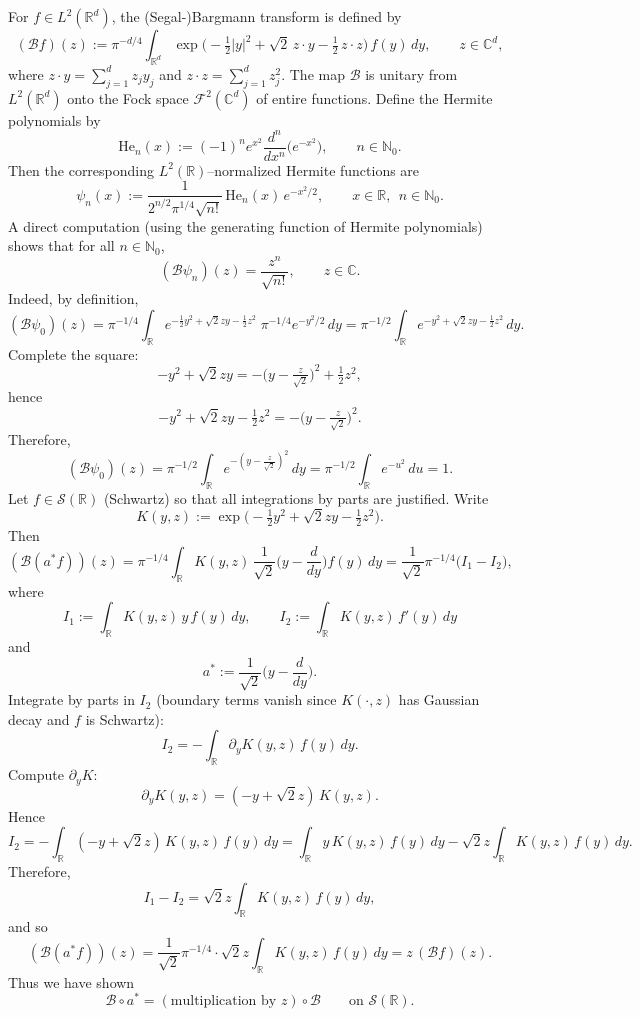 \documentclass[11pt]{article}
\theoremstyle{remark}
\numberwithin{equation}{section}
\newcommand{\C}{\mathbb{C}}
\newcommand{\R}{\mathbb{R}}
\newcommand{\N}{\mathbb{N}}
\begin{document}
For $f\in L^2(\R^d)$, the (Segal-)Bargmann transform is defined by
\[
(\mathcal B f)(z)
:=\pi^{-d/4}\int_{\R^d}
\exp\!\Big(-\tfrac12|y|^2+\sqrt2\,z\cdot y-\tfrac12\,z\cdot z\Big)\,f(y)\,dy,
\qquad z\in\C^d,
\]
where $z\cdot y=\sum_{j=1}^d z_j y_j$ and $z\cdot z=\sum_{j=1}^d z_j^2$.
The map $\mathcal B$ is unitary from $L^2(\R^d)$ onto the Fock space
$\mathcal F^2(\C^d)$ of entire functions. Define the  Hermite polynomials by
\[
\mathrm{He}_n(x):=(-1)^n e^{x^2}\frac{d^n}{dx^n}\Big(e^{-x^2}\Big),
\qquad n\in\N_0.
\]
Then the corresponding $L^2(\R)$--normalized Hermite functions are
\begin{equation}\label{eq:psi-n-prob}
\psi_n(x)
:=\frac{1}{2^{n/2}\pi^{1/4}\sqrt{n!}}\,
\mathrm{He}_n(x)\,e^{-x^2/2},
\qquad x\in\R,\ \ n\in\N_0.
\end{equation}
A direct computation (using the generating function of Hermite polynomials)
shows that for all $n\in\N_0$,
\[
(\mathcal B\psi_n)(z)=\frac{z^n}{\sqrt{n!}},
\qquad z\in\C.
\]
Indeed, by definition,
\[
(\mathcal B\psi_0)(z)
=\pi^{-1/4}\int_{\R}
e^{-\frac12 y^2+\sqrt2zy-\frac12 z^2}\;\pi^{-1/4}e^{-y^2/2}\,dy
=\pi^{-1/2}\int_{\R}e^{-y^2+\sqrt2zy-\frac12 z^2}\,dy.
\]
Complete the square:
\[
-y^2+\sqrt2zy=-\big(y-\tfrac{z}{\sqrt2}\big)^2+\tfrac12 z^2,
\]
hence
\[
-y^2+\sqrt2zy-\tfrac12 z^2=-\big(y-\tfrac{z}{\sqrt2}\big)^2.
\]
Therefore,
\[
(\mathcal B\psi_0)(z)
=\pi^{-1/2}\int_{\R}e^{-(y-\frac{z}{\sqrt2})^2}\,dy
=\pi^{-1/2}\int_{\R}e^{-u^2}\,du
=1.
\]
Let $f\in\mathcal S(\R)$ (Schwartz) so that all integrations by parts are justified.
Write
\[
K(y,z):=\exp\!\Big(-\tfrac12 y^2+\sqrt2zy-\tfrac12 z^2\Big).
\]
Then
\[
(\mathcal B(a^\ast f))(z)
=\pi^{-1/4}\int_{\R}K(y,z)\,\frac{1}{\sqrt2}\Big(y-\frac{d}{dy}\Big)f(y)\,dy
=\frac{1}{\sqrt2}\pi^{-1/4}\Big(I_1-I_2\Big),
\]
where
\[
I_1:=\int_{\R}K(y,z)\,y\,f(y)\,dy,
\qquad
I_2:=\int_{\R}K(y,z)\,f'(y)\,dy
\]
and
\[
a^\ast:=\frac{1}{\sqrt2}\Big(y-\frac{d}{dy}\Big).
\]
Integrate by parts in $I_2$ (boundary terms vanish since $K(\cdot,z)$ has Gaussian decay and
$f$ is Schwartz):
\[
I_2=-\int_{\R}\partial_y K(y,z)\,f(y)\,dy.
\]
Compute $\partial_y K$:
\[
\partial_y K(y,z)=(-y+\sqrt2 z)\,K(y,z).
\]
Hence
\[
I_2=-\int_{\R}(-y+\sqrt2 z)\,K(y,z)\,f(y)\,dy
=\int_{\R}y\,K(y,z)\,f(y)\,dy-\sqrt2 z\int_{\R}K(y,z)\,f(y)\,dy.
\]
Therefore,
\[
I_1-I_2
=\sqrt2 z\int_{\R}K(y,z)\,f(y)\,dy,
\]
and so
\[
(\mathcal B(a^\ast f))(z)
=\frac{1}{\sqrt2}\pi^{-1/4}\cdot\sqrt2 z\int_{\R}K(y,z)\,f(y)\,dy
=z\,(\mathcal B f)(z).
\]
Thus we have shown
\begin{equation}\label{eq:intertwine}
\mathcal B\circ a^\ast = (\text{multiplication by }z)\circ \mathcal B
\qquad\text{on }\mathcal S(\R).
\end{equation}
\end{document}
